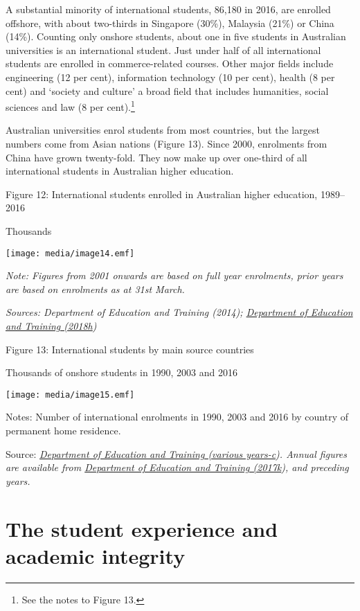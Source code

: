 \documentclass[]{book}
\begin{document}
A substantial minority of international students, 86,180 in 2016, are enrolled offshore, with about two-thirds in Singapore (30\%), Malaysia (21\%) or China (14\%). Counting only onshore students, about one in five students in Australian universities is an international student. Just under half of all international students are enrolled in commerce-related courses. Other major fields include engineering (12 per cent), information technology (10 per cent), health (8 per cent) and `society and culture' a broad field that includes humanities, social sciences and law (8 per cent).\footnote{See the notes to Figure 13.}

Australian universities enrol students from most countries, but the largest numbers come from Asian nations (Figure 13). Since 2000, enrolments from China have grown twenty-fold. They now make up over one-third of all international students in Australian higher education.

\protect\hypertarget{_Ref522712886}{}{}Figure 12: International students enrolled in Australian higher education, 1989--2016

Thousands

\texttt{[image: media/image14.emf]}

\emph{Note: Figures from 2001 onwards are based on full year enrolments, prior years are based on enrolments as at 31st March.}

\emph{Sources: Department of Education and Training (2014); \protect\hyperlink{_ENREF_87}{Department of Education and Training (2018h})}

\protect\hypertarget{_Ref521521798}{}{}Figure 13: International students by main source countries

Thousands of onshore students in 1990, 2003 and 2016

\texttt{[image: media/image15.emf]}

Notes: Number of international enrolments in 1990, 2003 and 2016 by country of permanent home residence.

Source: \emph{\protect\hyperlink{_ENREF_114}{Department of Education and Training (various years-c}). Annual figures are available from \protect\hyperlink{_ENREF_77}{Department of Education and Training (2017k}), and preceding years. }

\hypertarget{the-student-experience-and-academic-integrity}{%
\chapter{The student experience and academic integrity}\label{the-student-experience-and-academic-integrity}}
\end{document}
